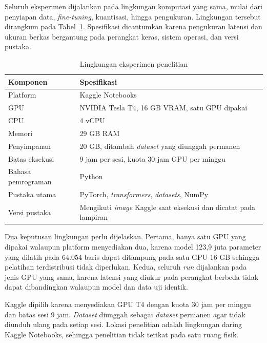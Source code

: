 Seluruh eksperimen dijalankan pada lingkungan komputasi yang sama, mulai dari penyiapan data, \textit{fine-tuning}, kuantisasi, hingga pengukuran. Lingkungan tersebut dirangkum pada Tabel~\ref{tab:lingkungan}. Spesifikasi dicantumkan karena pengukuran latensi dan ukuran berkas bergantung pada perangkat keras, sistem operasi, dan versi pustaka.

\begin{table}[!ht]
  \centering
  \small
  \renewcommand{\arraystretch}{1.2}
  \caption{Lingkungan eksperimen penelitian}
  \label{tab:lingkungan}
  \begin{tabularx}{\textwidth}{@{}>{\raggedright\arraybackslash}p{4.2cm}X@{}}
    \hline
    \textbf{Komponen} & \textbf{Spesifikasi} \\
    \hline
    Platform & Kaggle Notebooks \\
    GPU & NVIDIA Tesla T4, 16 GB VRAM, satu GPU dipakai \\
    CPU & 4 vCPU \\
    Memori & 29 GB RAM \\
    Penyimpanan & 20 GB, ditambah \textit{dataset} yang diunggah permanen \\
    Batas eksekusi & 9 jam per sesi, kuota 30 jam GPU per minggu \\
    Bahasa pemrograman & Python \\
    Pustaka utama & PyTorch, \textit{transformers}, \textit{datasets}, NumPy \\
    Versi pustaka & Mengikuti \textit{image} Kaggle saat eksekusi dan dicatat pada lampiran \\
    \hline
  \end{tabularx}
\end{table}

Dua keputusan lingkungan perlu dijelaskan. Pertama, hanya satu GPU yang dipakai walaupun platform menyediakan dua, karena model 123,9 juta parameter yang dilatih pada 64.054 baris dapat ditampung pada satu GPU 16 GB sehingga pelatihan terdistribusi tidak diperlukan. Kedua, seluruh \textit{run} dijalankan pada jenis GPU yang sama, karena latensi yang diukur pada perangkat berbeda tidak dapat dibandingkan walaupun model dan data uji identik.

Kaggle dipilih karena menyediakan GPU T4 dengan kuota 30 jam per minggu dan batas sesi 9 jam. \textit{Dataset} diunggah sebagai \textit{dataset} permanen agar tidak diunduh ulang pada setiap sesi. Lokasi penelitian adalah lingkungan daring Kaggle Notebooks, sehingga penelitian tidak terikat pada satu ruang fisik.

